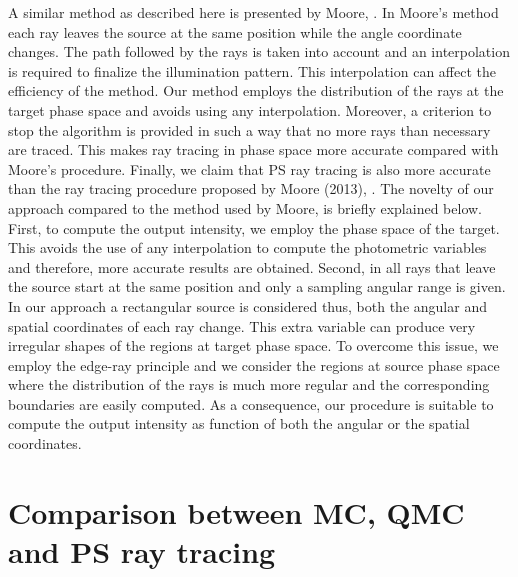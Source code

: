 \indent A similar method as described here is presented by Moore, \cite{moore2013methods}. In Moore's method each ray leaves the source at the same position while the angle coordinate changes. The path followed by the rays is taken into account and an interpolation is required to finalize the illumination pattern.
 This interpolation can affect the efficiency of the method. Our method employs the distribution of the rays at the target phase space and avoids using any interpolation. Moreover, a criterion to stop the algorithm is provided in such a way that no more rays than necessary are traced. This makes ray tracing in phase space more accurate compared with Moore's procedure.
 Finally, we claim that PS ray tracing is also more accurate than the ray tracing procedure proposed by Moore (2013), \cite{moore2013methods}.
The novelty of our approach compared to the method used by Moore, is briefly explained below.
First, to compute the output intensity, we employ the phase space of the target. This avoids the use of any interpolation to compute the photometric variables and therefore, more accurate results are obtained.
Second, in \cite{moore2013methods} all rays that leave the source start at the same position and only a sampling angular range is given. In our approach a rectangular source is considered thus, both the angular and spatial coordinates of each ray change. This extra variable can produce very irregular shapes of the regions at target phase space. To overcome this issue, we employ the edge-ray principle and we consider the regions at source phase space where the distribution of the rays is much more regular and the corresponding boundaries are easily computed.
As a consequence, our procedure is suitable to compute the output intensity as function of both the angular or the spatial coordinates.

\section{Comparison between MC, QMC and PS ray tracing}










